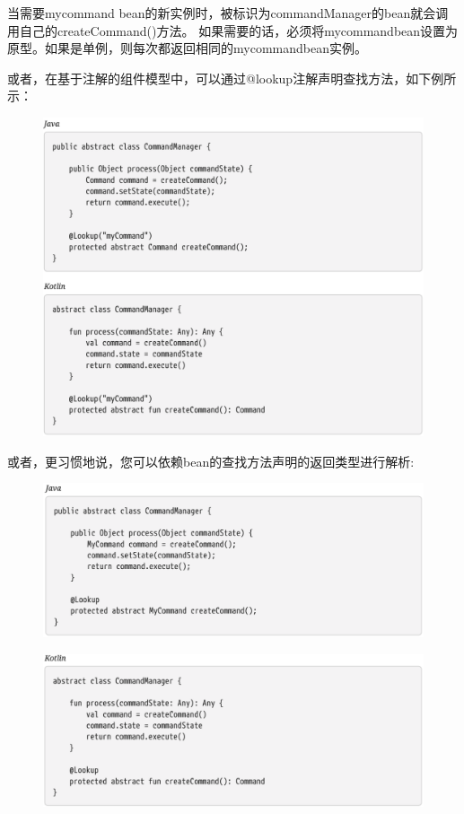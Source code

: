 当需要mycommand bean的新实例时，被标识为commandManager的bean就会调用自己的createCommand()方法。
如果需要的话，必须将mycommandbean设置为原型。如果是单例，则每次都返回相同的mycommandbean实例。

\newpage
或者，在基于注解的组件模型中，可以通过@lookup注解声明查找方法，如下例所示：
\begin{figure}[ht]
    \centering
    \includegraphics[width=1\linewidth]{./Figure/65.png}
\end{figure}

\newpage
或者，更习惯地说，您可以依赖bean的查找方法声明的返回类型进行解析:
\begin{figure}[ht]
    \centering
    \includegraphics[width=1\linewidth]{./Figure/66.png}
\end{figure}
\begin{figure}[ht]
    \centering
    \includegraphics[width=1\linewidth]{./Figure/67.png}
\end{figure}

